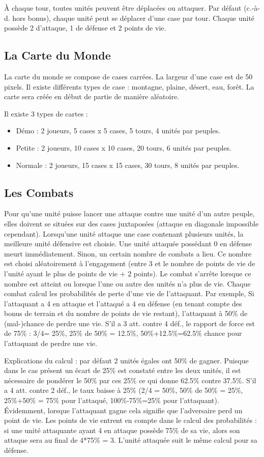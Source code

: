 \documentclass[a4paper]{article}%
\begin{document}
À chaque tour, toutes unités peuvent être déplacées ou attaquer. Par défaut (c.-à-d. hors bonus), chaque unité peut se déplacer d’une case par tour. Chaque unité possède 2 d’attaque, 1 de défense et 2 points de vie.

\subsection{La Carte du Monde}
La carte du monde se compose de cases carrées. La largeur d’une case est de 50 pixels. Il existe différents types de case : montagne, plaine, désert, eau, forêt. La carte sera créée en début de partie de manière aléatoire.

Il existe 3 types de cartes :
\begin{itemize}
\item Démo : 2 joueurs, 5 cases x 5 cases, 5 tours, 4 unités par peuples.
\item Petite : 2 joueurs, 10 cases x 10 cases, 20 tours, 6 unités par peuples.
\item Normale : 2 joueurs, 15 cases x 15 cases, 30 tours, 8 unités par peuples.
\end{itemize}

\subsection{Les Combats}
Pour qu’une unité puisse lancer une attaque contre une unité d’un autre peuple, elles doivent se situées sur des cases juxtaposées (attaque en diagonale impossible cependant). Lorsqu’une unité attaque une case contenant plusieurs unités, la meilleure unité défensive est choisie. Une unité attaquée possédant 0 en défense meurt immédiatement. Sinon, un certain nombre de combats a lieu. Ce nombre est choisi aléatoirement à l’engagement (entre 3 et le nombre de points de vie de l’unité ayant le plus de points de vie + 2 points). Le combat s’arrête lorsque ce nombre est atteint ou lorsque l’une ou autre des unités n’a plus de vie. Chaque combat calcul les probabilités de perte d’une vie de l’attaquant. Par exemple, Si l’attaquant a 4 en attaque et l’attaqué a 4 en défense (en tenant compte des bonus de terrain et du nombre de points de vie restant), l’attaquant à 50\% de (mal-)chance de perdre une vie. S’il a 3 att. contre 4 déf., le rapport de force est de 75\% : 3/4= 25\%, 25\% de 50\% = 12.5\%, 50\%+12.5\%=62.5\% chance pour l’attaquant de perdre une vie.

Explications du calcul : par défaut 2 unités égales ont 50\% de gagner. Puisque dans le cas présent un écart de 25\% est constaté entre les deux unités, il est nécessaire de pondérer le 50\% par ces 25\% ce qui donne 62.5\% contre 37.5\%. S’il a 4 att. contre 2 déf., le taux baisse à 25\% (2/4 = 50\%, 50\% de 50\% = 25\%, 25\%+50\% = 75\% pour l’attaqué, 100\%-75\%=25\% pour l’attaquant). Évidemment, lorsque l’attaquant gagne cela signifie que l’adversaire perd un point de vie. Les points de vie entrent en compte dans le calcul des probabilités : si une unité attaquante ayant 4 en attaque possède 75\% de sa vie, alors son attaque sera au final de 4*75\% = 3. L’unité attaquée suit le même calcul pour sa défense. 
\end{document}

